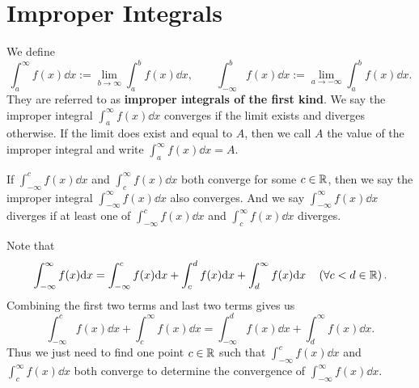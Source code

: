     \section{Improper Integrals}
    \begin{definitionenv}
        We define $$\displaystyle \int_a^\infty f(x) \dd x:= \displaystyle \lim_{b\to \infty} \int_a^b f(x) \dd x,\qquad \displaystyle \int_{-\infty}^b f(x) \dd x:= \lim_{a\to -\infty} \int_a^b f(x) \dd x.$$ They are referred to as \textbf{improper integrals of the first kind}. We say the improper integral $\displaystyle \int_a^\infty f(x) \dd x$ converges if the limit exists and diverges otherwise. If the limit does exist and equal to $A$, then we call $A$ the value of the improper integral and write $\displaystyle \int_a^\infty f(x) \dd x=A$.

        If $\displaystyle \int_{-\infty}^c f(x) \dd x$ and $\displaystyle \int_c^\infty f(x) \dd x$ both converge for some $c\in \mathbb{R}$, then we say the improper integral $\displaystyle \int_{-\infty}^\infty f(x) \dd x$ also converges. And we say $\displaystyle \int_{-\infty}^\infty f(x) \dd x$ diverges if at least one of $\displaystyle \int_{-\infty}^c f(x) \dd x$ and $\displaystyle \int_c^\infty f(x) \dd x$ diverges.
    \end{definitionenv}
    \begin{remarkenv}
        Note that
        \[
        \int_{-\infty}^\infty f(x) \dd x = \int_{-\infty}^c f(x) \dd x + \int_c^d f(x) \dd x + \int_d^\infty f(x) \dd x \quad \left( \forall c<d\in \mathbb{R} \right).
        \]
        Combining the first two terms and last two terms gives us
        \[
        \int_{-\infty}^c f(x) \dd x + \int_c^\infty f(x) \dd x = \int_{-\infty}^d f(x) \dd x + \int_d^\infty f(x) \dd x.
        \]
        Thus we just need to find one point $c\in \mathbb{R}$ such that $\displaystyle \int_{-\infty}^c f(x) \dd x$ and $\displaystyle \int_c^\infty f(x) \dd x$ both converge to determine the convergence of $\displaystyle \int_{-\infty}^\infty f(x) \dd x$.
    \end{remarkenv}
